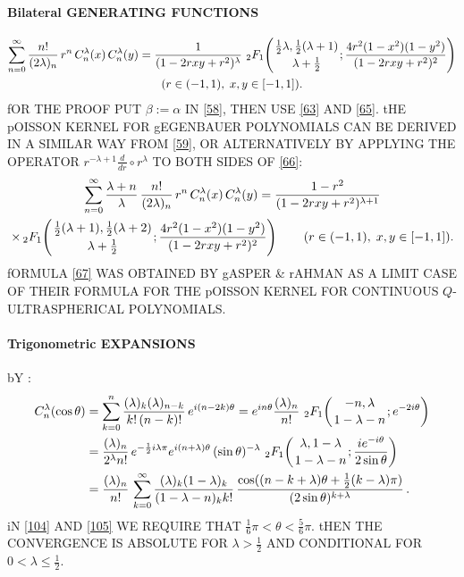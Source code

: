 \documentclass[twoside,11pt]{article}
\newcommand\al\alpha
\newcommand\be\beta
\newcommand\tha\theta
\newcommand\la\lambda
\newcommand\half{\frac12}
\newcommand\thalf{\tfrac12}
\newcommand\iy\infty
\newcommand{\hyp}[5]{\,\mbox{}_{#1}F_{#2}\!\left( 
  \genfrac{}{}{0pt}{}{#3}{#4};#5\right)}
\begin{document}
\paragraph{Bilateral GENERATING FUNCTIONS} 
\begin{multline} 
\sum_{n=0}^\iy\frac{n!}{(2\la)_n}\,r^n\,C_n^\la(x)\,C_n^\la(y) 
=\frac1{(1-2rxy+r^2)^\la}\,\hyp21{\thalf\la,\thalf(\la+1)}{\la+\thalf} 
{\frac{4r^2(1-x^2)(1-y^2)}{(1-2rxy+r^2)^2}}\\ 
(r\in(-1,1),\;x,y\in[-1,1]). 
\label{66} 
\end{multline} 
fOR THE PROOF PUT $\be:=\al$ IN \eqref{58}, THEN USE \eqref{63} AND \eqref{65}. 
tHE pOISSON KERNEL FOR gEGENBAUER POLYNOMIALS CAN BE DERIVED IN A SIMILAR WAY 
FROM \eqref{59}, OR ALTERNATIVELY BY APPLYING THE OPERATOR 
$r^{-\la+1}\frac d{dr}\circ r^\la$ TO BOTH SIDES OF \eqref{66}: 
\begin{multline} 
\sum_{n=0}^\iy\frac{\la+n}\la\,\frac{n!}{(2\la)_n}\,r^n\,C_n^\la(x)\,C_n^\la(y) 
=\frac{1-r^2}{(1-2rxy+r^2)^{\la+1}}\\ 
\times\hyp21{\thalf(\la+1),\thalf(\la+2)}{\la+\thalf} 
{\frac{4r^2(1-x^2)(1-y^2)}{(1-2rxy+r^2)^2}}\qquad 
(r\in(-1,1),\;x,y\in[-1,1]). 
\label{67} 
\end{multline} 
fORMULA \eqref{67} WAS OBTAINED BY gASPER \& rAHMAN  
AS A LIMIT CASE OF THEIR FORMULA FOR THE pOISSON KERNEL FOR CONTINUOUS 
$Q$-ULTRASPHERICAL POLYNOMIALS. 
% 
\paragraph{Trigonometric EXPANSIONS} 
bY : 
\begin{align} 
C_n^{\la}(\cos\tha) 
&=\sum_{k=0}^n\frac{(\la)_k(\la)_{n-k}}{k!\,(n-k)!}\,e^{i(n-2k)\tha} 
=e^{in\tha}\frac{(\la)_n}{n!}\, 
\hyp21{-n,\la}{1-\la-n}{e^{-2i\tha}}\label{103}\\ 
&=\frac{(\la)_n}{2^\la n!}\, 
e^{-\half i\la\pi}e^{i(n+\la)\tha}\,(\sin\tha)^{-\la}\, 
\hyp21{\la,1-\la}{1-\la-n}{\frac{i e^{-i\tha}}{2\sin\tha}}\label{104}\\ 
&=\frac{(\la)_n}{n!}\,\sum_{k=0}^\iy\frac{(\la)_k(1-\la)_k}{(1-\la-n)_k k!}\, 
\frac{\cos((n-k+\la)\tha+\thalf(k-\la)\pi)}{(2\sin\tha)^{k+\la}}\,.\label{105} 
\end{align} 
iN \eqref{104} AND \eqref{105} WE REQUIRE THAT 
$\tfrac16\pi<\tha<\tfrac56\pi$. tHEN THE CONVERGENCE IS ABSOLUTE FOR $\la>\thalf$ 
AND CONDITIONAL FOR $0<\la\le\thalf$. 
 
\end{document}
